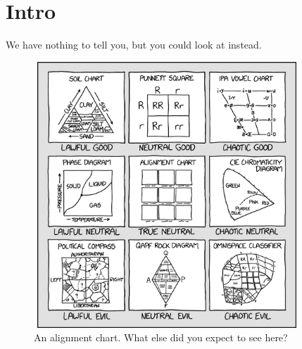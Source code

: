 \documentclass[../main.tex]{subfiles}
\begin{document}
\section{Intro}\label{sec:Intro}

We have nothing to tell you, but you could look at  instead.

\begin{figure}[h] %
  \centering
  \includegraphics[width=10cm,height=10cm,keepaspectratio]{alignment_chart_alignment_chart.png}%
  \caption[Alignment Chart]{An alignment chart\protect\footnotemark. What else did you expect to see here?}%
  \label{fig:AlignmentChartAlignmentChart}
\end{figure}
\end{document}
